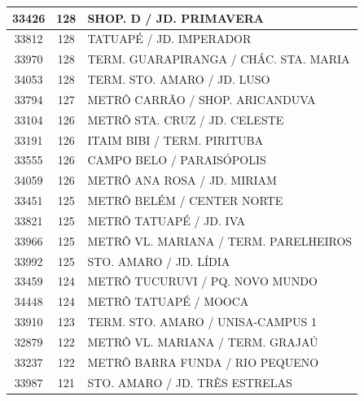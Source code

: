 \documentclass[
	12pt,				%
	oneside,			%
	a4paper,			%
	english,			%
	brazil				%
	]{abntex2ppgsi}
\begin{document}
{{\begin{apendicesenv}
\begin{longtable}{c|c|p{7cm}}
    33426 & 128   & SHOP. D / JD. PRIMAVERA \\
\hline

    33812 & 128   & TATUAPÉ / JD. IMPERADOR \\
\hline

    33970 & 128   & TERM. GUARAPIRANGA / CHÁC. STA. MARIA \\
\hline

    34053 & 128   & TERM. STO. AMARO / JD. LUSO \\
\hline

    33794 & 127   & METRÔ CARRÃO / SHOP. ARICANDUVA \\
\hline

    33104 & 126   & METRÔ STA. CRUZ / JD. CELESTE \\
\hline

    33191 & 126   & ITAIM BIBI / TERM. PIRITUBA \\
\hline

    33555 & 126   & CAMPO BELO / PARAISÓPOLIS \\
\hline

    34059 & 126   & METRÔ ANA ROSA / JD. MIRIAM \\
\hline

    33451 & 125   & METRÔ BELÉM      / CENTER NORTE \\
\hline

    33821 & 125   & METRÔ TATUAPÉ / JD. IVA \\
\hline

    33966 & 125   & METRÔ VL. MARIANA / TERM. PARELHEIROS \\
\hline

    33992 & 125   & STO. AMARO / JD. LÍDIA \\
\hline

    33459 & 124   & METRÔ TUCURUVI / PQ. NOVO MUNDO \\
\hline

    34448 & 124   & METRÔ TATUAPÉ / MOOCA \\
\hline

    33910 & 123   & TERM. STO. AMARO / UNISA-CAMPUS 1 \\
\hline

    32879 & 122   & METRÔ VL. MARIANA / TERM. GRAJAÚ \\
\hline

    33237 & 122   & METRÔ BARRA FUNDA / RIO PEQUENO \\
\hline

    33987 & 121   & STO. AMARO / JD. TRÊS ESTRELAS \\
\hline


\end{longtable}
\end{apendicesenv}}}
\end{document}
